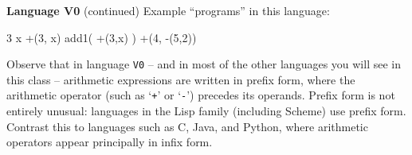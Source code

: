 \begin{minipage}[t]{\sw}
\slidenumber
\LARGE
{\bf Language V0} (continued)\exx
Example ``programs'' in this language:
\begin{qv}
3
x
+(3, x)
add1( +(3,x) )
+(4, -(5,2))
\end{qv}
Observe that in language \verb'V0' --
and in most of the other languages you will see in this class --
arithmetic expressions are written in prefix form,
where the arithmetic operator (such as `\verb'+'' or `\verb'-'')
precedes its operands.
Prefix form is not entirely unusual:
languages in the Lisp family (including Scheme) use prefix form.
Contrast this to languages such as C, Java, and Python,
where arithmetic operators appear principally in infix form.
\end{minipage}
